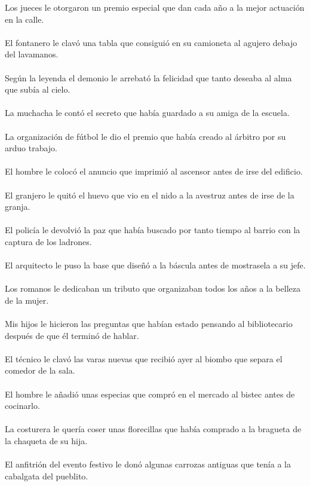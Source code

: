 Los jueces le otorgaron un premio especial que dan cada año a la mejor actuación en la calle.	\\	\\
El fontanero le clavó una tabla que consiguió en su camioneta al agujero debajo del lavamanos.	\\	\\
Según la leyenda el demonio le arrebató la felicidad que tanto deseaba al alma que subía al cielo.	\\	\\
La muchacha le contó el secreto que había guardado a su amiga de la escuela.	\\	\\
La organización de fútbol le dio el premio que había creado al árbitro por su arduo trabajo.	\\	\\
El hombre le colocó el anuncio que imprimió al ascensor antes de irse del edificio.	\\	\\
El granjero le quitó el huevo que vio en el nido a la avestruz antes de irse de la granja.	\\	\\
El policía le devolvió la paz que había buscado por tanto tiempo al barrio con la captura de los ladrones.	\\	\\
El arquitecto le puso la base que diseñó a la báscula antes de mostrasela a su jefe.	\\	\\
Los romanos le dedicaban un tributo que organizaban todos los años a la belleza de la mujer.	\\	\\
Mis hijos le hicieron las preguntas que habían estado pensando al bibliotecario después de que él terminó de hablar.	\\	\\
El técnico le clavó las varas nuevas que recibió ayer al biombo que separa el comedor de la sala.	\\	\\
El hombre le añadió unas especias que compró en el mercado al bistec antes de cocinarlo.	\\	\\
La costurera le quería coser unas florecillas que había comprado a la bragueta de la chaqueta de su hija.	\\	\\
El anfitrión del evento festivo le donó algunas carrozas antiguas que tenía a la cabalgata del pueblito.	\\	\\

